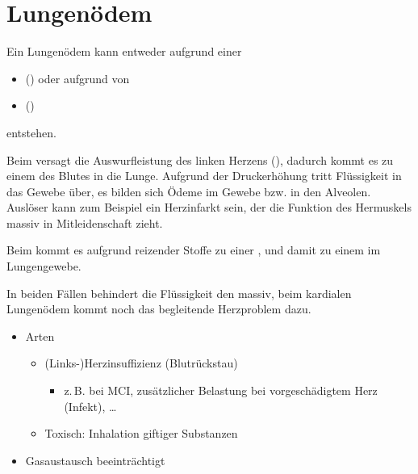 \section{Lungenödem}
\label{topic:lungenoedem}

\nopagebreak

{%
Ein Lungenödem kann entweder aufgrund einer
\begin{itemize}
  \item {} () oder aufgrund
  von
  \item {} ()
\end{itemize}
entstehen.

Beim  versagt die Auswurfleistung
des linken Herzens (), dadurch
kommt es zu einem  des Blutes in die Lunge.
Aufgrund der Druckerhöhung tritt Flüssigkeit in das Gewebe
über, es bilden sich Ödeme im Gewebe bzw.
 in den Alveolen. Auslöser kann
zum Beispiel ein Herzinfarkt sein, der die Funktion des
Hermuskels massiv in Mitleidenschaft zieht.

Beim  kommt es aufgrund reizender
Stoffe zu einer , und damit zu einem
 im Lungengewebe.

In beiden Fällen behindert die Flüssigkeit den
 massiv, beim kardialen Lungenödem kommt
noch das begleitende Herzproblem dazu.

}{
\begin{itemize}
  \item Arten
  \begin{itemize}
    \item (Links-)Herzinsuffizienz (Blutrückstau)
    \begin{itemize}
      \item z.\,B. bei MCI, zusätzlicher Belastung bei vorgeschädigtem Herz
      (Infekt), \ldots
    \end{itemize}
    \item Toxisch: Inhalation giftiger Substanzen
  \end{itemize}
  \item Gasaustausch beeinträchtigt
\end{itemize}

}{}{}{}









